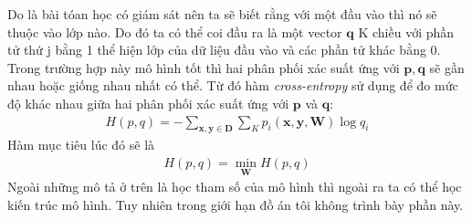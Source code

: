 \documentclass[fontsize=12pt]{scrartcl}
\begin{document}
\par
Do là bài tóan học có giám sát nên ta sẽ biết rằng với một đầu vào thì nó sẽ thuộc vào lớp nào. Do đó ta có thể coi đầu ra là một vector $\boldsymbol{q}$ K chiều với phần tử thứ j bằng 1 thể hiện lớp của dữ liệu đầu vào và các phần tử khác bằng 0. Trong trường hợp này mô hình tốt thì hai phân phối xác suất ứng với $\boldsymbol{p}, \boldsymbol{q}$ sẽ gần nhau hoặc giống nhau nhất có thể. Từ đó hàm \textit{cross-entropy} sử dụng để đo mức độ khác nhau giữa hai phân phối xác suất ứng với $\boldsymbol{p}$ và $\boldsymbol{q}$:
\begin{align}
H(p,q) = -\displaystyle\sum_{\boldsymbol{x}, \boldsymbol{y}\in \boldsymbol{D}}\sum_{K}p_i(\boldsymbol{x}, \boldsymbol{y},\boldsymbol{W})\log q_i
\end{align}
Hàm mục tiêu lúc đó sẽ là
\begin{align}
H(p,q) = \displaystyle\min_{\boldsymbol{W}}H(p,q)
\end{align}
Ngoài những mô tả ở trên là học tham số của mô hình thì ngoài ra ta có thể học kiến trúc mô hình. Tuy nhiên trong giới hạn đồ án tôi không trình bày phần này.
\end{document}
